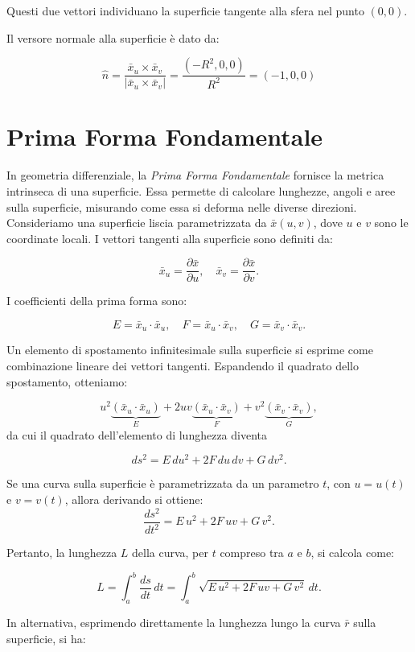 Questi due vettori individuano la superficie tangente alla sfera nel punto $(0,0)$.

Il versore normale alla superficie è dato da:

$$
\hat {n} = \dfrac{\bar x_u \times \bar x_v}{|\bar x_u \times \bar x_v|} = \dfrac{(-R^2, 0, 0)}{R^2} = (-1, 0, 0)
$$

\newpage

\section{Prima Forma Fondamentale}

In geometria differenziale, la \emph{Prima Forma Fondamentale} fornisce la metrica intrinseca di una superficie. Essa permette di calcolare lunghezze, angoli e aree sulla superficie, misurando come essa si deforma nelle diverse direzioni. Consideriamo una superficie liscia parametrizzata da $\bar{x}(u,v)$, dove $u$ e $v$ sono le coordinate locali. I vettori tangenti alla superficie sono definiti da:

$$
\bar{x}_u = \frac{\partial \bar{x}}{\partial u}, \quad \bar{x}_v = \frac{\partial \bar{x}}{\partial v}.
$$

I coefficienti della prima forma sono:

$$
E = \bar{x}_u \cdot \bar{x}_u,\quad F = \bar{x}_u \cdot \bar{x}_v,\quad G = \bar{x}_v \cdot \bar{x}_v.
$$

Un elemento di spostamento infinitesimale sulla superficie si esprime come combinazione lineare dei vettori tangenti. Espandendo il quadrato dello spostamento, otteniamo:

$$
u^2\underbrace{\left(\bar{x}_u \cdot \bar{x}_u\right)}_E + 2uv\underbrace{\left(\bar{x}_u \cdot \bar{x}_v\right)}_F + v^2\underbrace{\left(\bar{x}_v \cdot \bar{x}_v\right)}_G,
$$
da cui il quadrato dell'elemento di lunghezza diventa

$$
ds^2 = E\,du^2 + 2F\,du\,dv + G\,dv^2.
$$

Se una curva sulla superficie è parametrizzata da un parametro $t$, con $u = u(t)$ e $v = v(t)$, allora derivando si ottiene:
$$
\frac{ds^2}{dt^2} = E\, u^2 + 2F\,uv + G\,v^2.
$$

Pertanto, la lunghezza $L$ della curva, per $t$ compreso tra $a$ e $b$, si calcola come:

$$
L = \int_a^b \frac{ds}{dt}\, dt = \int_a^b \sqrt{E\, u^2 + 2F\,uv + G\,v^2}\, dt.
$$

In alternativa, esprimendo direttamente la lunghezza lungo la curva $\bar{r}$ sulla superficie, si ha:

